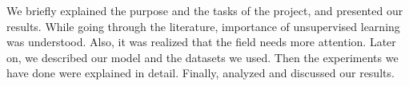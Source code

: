 \documentclass[journal]{IEEEtran}
\begin{document}
We briefly explained the purpose and the tasks of the project, and presented our results. While going through the literature, importance of unsupervised learning was understood. Also, it was realized that the field needs more attention. Later on, we described our model and the datasets we used. Then the experiments we have done were explained in detail. Finally, analyzed and discussed our results.
\newpage 


%








\end{document}
